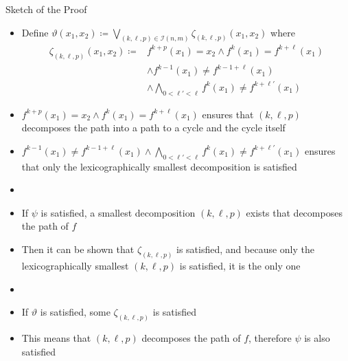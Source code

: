 \documentclass[aspectratio=169]{beamer}
\renewcommand{\theta}{\vartheta}
\begin{document}
	\begin{frame}[allowframebreaks]{Sketch of the Proof}
		\begin{itemize}
			\item Define $\theta(x_1,x_2)\coloneqq \bigvee_{(k,\ell,p)\in \mathcal I(n,m)} \zeta_{(k,\ell,p)}(x_1,x_2)$ where
			\begin{align*}
				\zeta_{(k,\ell,p)}(x_1,x_2)\coloneqq & f^{k+p}(x_1)=x_2 \land f^{k}(x_1)=f^{k+\ell}(x_1) \\
				& \land f^{k-1}(x_1)\neq f^{k-1+\ell}(x_1)  \\
				& \land \bigwedge_{0<\ell'<\ell}f^{k}(x_1)\neq f^{k+\ell'}(x_1)
			\end{align*}
			\begin{center}
			\end{center}
			\item $f^{k+p}(x_1)=x_2 \land f^{k}(x_1)=f^{k+\ell}(x_1)$ ensures that $(k,\ell,p)$ decomposes the path into a path to a cycle and the cycle itself
			\item $f^{k-1}(x_1)\neq f^{k-1+\ell}(x_1) \land \bigwedge_{0<\ell'<\ell}f^{k}(x_1)\neq f^{k+\ell'}(x_1)$ ensures that only the lexicographically smallest decomposition is satisfied
			\item[]
			\item If $\psi$ is satisfied, a smallest decomposition $(k,\ell,p)$ exists that decomposes the path of $f$
			\item Then it can be shown that $\zeta_{(k,\ell,p)}$ is satisfied, and because only the lexicographically smallest $(k,\ell,p)$ is satisfied, it is the only one
			\item[]
			\item If $\theta$ is satisfied, some $\zeta_{(k,\ell,p)}$ is satisfied
			\item This means that $(k,\ell,p)$ decomposes the path of $f$, therefore $\psi$ is also satisfied
		\end{itemize}
	\end{frame}
	
\end{document}
